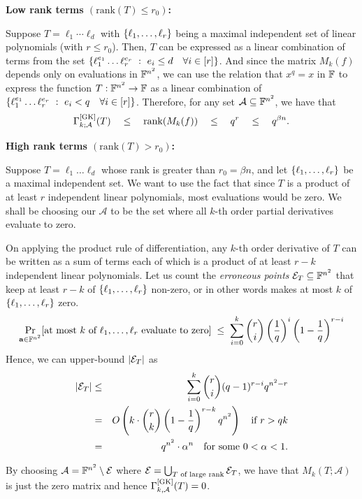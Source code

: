 \noindent 
{\bf Low rank terms $(\mathrm{rank}(T) \leq r_0)$:}

Suppose $T = \ell_1 \cdots \ell_d$ with $\left\{\ell_1, \dots,
  \ell_r\right\}$ being a maximal independent set of linear polynomials (with
$r \leq r_0$). Then, $T$ can be expressed as a linear combination of
terms from the set $\left\{{\ell_1^{e_1}\dots \ell_r^{e_r}}\ : \ {e_i\leq d
  \quad \forall i\in [r]}\right\}$. And since the matrix $M_k(f)$ depends only
on evaluations in $\mathbb{F}^{n^2}$, we can use the relation that $x^q = x$
in $\mathbb{F}$ to express the function $T:\mathbb{F}^{n^2}\rightarrow \mathbb{F}$ as a linear
combination of $\left\{{\ell_1^{e_1}\dots \ell_r^{e_r}}\ : \ {e_i<q \quad
  \forall i\in [r]}\right\}$. Therefore, for any set $\mathcal{A}\subseteq
\mathbb{F}^{n^2}$, we have that
$$
\Gamma^{\mathrm{[GK]}}_{k;\mathcal{A}}(T) \quad \leq \quad
\mathrm{rank}(M_k(f)) \quad \leq \quad q^r \quad\leq \quad q^{\beta{n}}.
$$


\noindent
{\bf High rank terms $(\mathrm{rank}(T) > r_0)$:}

Suppose $T = \ell_1\dots \ell_d$ whose rank is greater than $r_0 =
\beta n$, and let $\left\{\ell_1, \dots, \ell_r\right\}$ be a maximal
independent set. We want to use the fact that since $T$ is a product
of at least $r$ independent linear polynomials, most evaluations would
be zero. We shall be choosing our $\mathcal{A}$ to be the set where
all $k$-th order partial derivatives evaluate to zero. 

On applying the product rule of differentiation, any $k$-th order 
derivative of $T$ can be written as a sum of terms each of which 
is a product of at least $r-k$ independent linear polynomials. Let us count the
\emph{erroneous points} $\mathcal{E}_T\subseteq \mathbb{F}^{n^2}$ that keep at
least $r-k$ of $\left\{\ell_1,\dots, \ell_r\right\}$ non-zero, or in other
words makes at most $k$ of $\left\{\ell_1,\dots, \ell_r\right\}$ zero.
$$
\Pr_{\mathbf{a}\in \mathbb{F}^{n^2}}[\text{at most $k$ of $\ell_1,\dots,
  \ell_r$ evaluate to zero}] \;\leq \; \sum_{i=0}^k \binom{r}{i} \left(\frac{1}{q}\right)^i\left(1 - \frac{1}{q}\right)^{r-i}
$$
Hence, we can upper-bound $\left|\mathcal{E}_T\right|$ as
\begin{eqnarray*}
\left|\mathcal{E}_T\right| &\leq & \sum_{i=0}^k \binom{r}{i} (q-1)^{r-i}q^{n^2 - r}\\
 & = & O\left(k\cdot \binom{r}{k}\left(1 - \frac{1}{q}\right)^{r-k} q^{n^2}\right) \quad\text{if $r > qk$}\\
 & = & q^{n^2} \cdot \alpha^n\quad\text{for some $0< \alpha < 1$}.
 \end{eqnarray*}

 By choosing $\mathcal{A} = \mathbb{F}^{n^2} \setminus \mathcal{E}$ where
 $\mathcal{E} = \bigcup_{\text{$T$ of large rank}} \mathcal{E}_T$, we
 have that $M_k(T;\mathcal{A})$ is just the zero matrix and hence
 $\Gamma^{\mathrm{[GK]}}_{k,\mathcal{A}}(T) = 0$.\\


